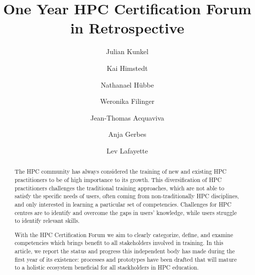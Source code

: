 \documentclass[jocse]{jocseart}
\begin{document}
\title{One Year HPC Certification Forum in Retrospective}

\author{Julian Kunkel}


\author{Kai Himstedt}
\author{Nathanael Hübbe}

\author{Weronika Filinger}

\author{Jean-Thomas Acquaviva}


\author{Anja Gerbes}

\author{Lev Lafayette}

\renewcommand{\shortauthors}{J. Kunkel et al.}


\begin{abstract}
  The HPC community has always considered the training of new and existing HPC practitioners to be of high importance to its growth.
  This diversification of HPC practitioners challenges the traditional training approaches, which are not able to satisfy the specific needs of users, often coming from non-traditionally HPC disciplines, and only interested in learning a particular set of competencies.
  Challenges for HPC centres are to identify and overcome the gaps in users’ knowledge, while users struggle to identify relevant skills.

  With the HPC Certification Forum we aim to clearly categorize, define, and examine competencies which brings benefit to all stakeholders involved in training.
  In this article, we report the status and progress this independent body has made during the first year of its existence: processes and prototypes have been drafted that will  mature to a holistic ecosystem beneficial for all stackholders in HPC education.
\end{abstract}

%
%
\begin{CCSXML}
\end{CCSXML}
\end{document}
